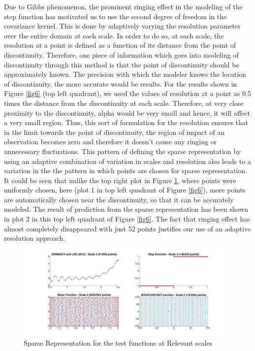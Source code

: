 \documentclass[procedia]{easychair}
\begin{document}
Due to Gibbs phenomenon, the prominent ringing effect in the modeling of the step function has motivated us to use the second degree of freedom in the covariance kernel. This is done by adaptively varying the resolution parameter over the entire domain at each scale. In order to do so, at each scale, the resolution at a point is defined as a function of its distance from the point of discontinuity. Therefore, one piece of information which goes into modeling of discontinuity through this method is that the point of discontinuity should be approximately known. The precision with which the modeler knows the location of discontinuity, the more accurate would be results. For the results shown in Figure \ref{fig6} (top left quadrant), we used the values of resolution at a point as 0.5 times the distance from the discontinuity at each scale. Therefore, at very close proximity to the discontinuity, alpha would be very small and hence, it will affect a very small region. Thus, this sort of formulation for the resolution ensures that in the limit towards the point of discontinuity, the region of impact of an observation becomes zero and therefore it doesn't cause any ringing or unnecessary fluctuations. This pattern of defining the sparse representation by using an adaptive combination of variation in scales and resolution also leads to a variation in the the pattern in which points are chosen for sparse representation. It could be seen that unlike the top right plot in Figure \ref{fig5}, where points were uniformly chosen, here (plot 1 in top left quadrant of Figure \ref{fig6}), more points are automatically chosen near the discontinuity, so that it can be accurately modeled. The result of prediction from the sparse representation has been shown in plot 2 in this top left quadrant of Figure \ref{fig6}. The fact that ringing effect has almost completely disappeared with just 52 points justifies our use of an adaptive resolution approach. 


\begin{figure}[]  %
	\centering
	\includegraphics[width=4.3in]{sparse.jpg}
	\caption[Optional caption]{Sparse Representation for the test functions at Relevant scales}
	\label{fig5} %
\end{figure}
\end{document}
